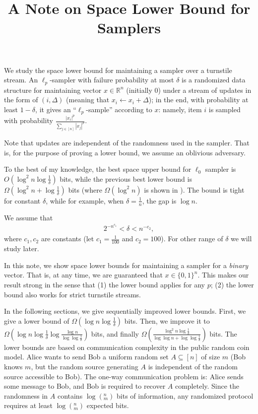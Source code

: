 \documentclass[10pt]{article}
\title{A Note on Space Lower Bound for Samplers}
\begin{document}
	
\maketitle

We study the space lower bound for maintaining a sampler over a turnstile stream. An $\ell_p$-sampler with failure probability at most $\delta$ is a randomized data structure for maintaining vector $x\in \mathbb{R}^n$ (initially 0) under a stream of updates in the form of $(i, \Delta)$ (meaning that $x_i \leftarrow x_i+\Delta$); in the end, with probability at least $1-\delta$, it gives an ``$\ell_p$-sample'' according to $x$: namely, item $i$ is sampled with probability $\frac{|x_i|^p}{\sum_{j\in [n]}{|x_j|^p}}$. 

Note that updates are independent of the randomness used in the sampler. That is, for the purpose of proving a lower bound, we assume an oblivious adversary. 

To the best of my knowledge, the best space upper bound for $\ell_0$ sampler is $O(\log^2 n \log \frac{1}{\delta})$ bits, while the previous best lower bound is $\Omega(\log^2 n +\log\frac{1}{\delta})$ bits (where $\Omega(\log^2 n)$ is shown in \cite{jowhari2011tight}). The bound is tight for constant $\delta$, while for example, when $\delta=\frac{1}{n}$, the gap is $\log n$. 

We assume that 
\begin{align} \label{formula:delta-range}
2^{-n^{c_1}}<\delta<n^{-c_2},
\end{align}
where $c_1, c_2$ are constants (let $c_1=\frac{1}{100}$ and $c_2=100$). For other range of $\delta$ we will study later.

In this note, we show space lower bounds for maintaining a sampler for a {\em binary} vector. That is, at any time, we are guaranteed that $x\in \{0,1\}^n$. This makes our result strong in the sense that (1) the lower bound applies for any $p$; (2) the lower bound also works for strict turnstile streams.

In the following sections, we give sequentially improved lower bounds. First, we give a lower bound of $\Omega(\log n \log \frac{1}{\delta})$ bits. Then, we improve it to $\Omega(\log n \log {\frac{1}{\delta}} \log \frac{\log n}{\log\log \frac{1}{\delta}})$ bits, and finally $\Omega(\frac{\log^2 n \log \frac{1}{\delta}}{\log\log n + \log\log \frac{1}{\delta}})$ bits. The lower bounds are based on communication complexity in the public random coin model. Alice wants to send Bob a uniform random set $A\subseteq [n]$ of size $m$ (Bob knows $m$, but the random source generating $A$ is independent of the random source accessible to Bob). The one-way communication problem is: Alice sends some message to Bob, and Bob is required to recover $A$ completely. Since the randomness in $A$ contains $\log (^n_m)$ bits of information, any randomized protocol requires at least $\log (^n_m)$ expected bits. 
\end{document}
